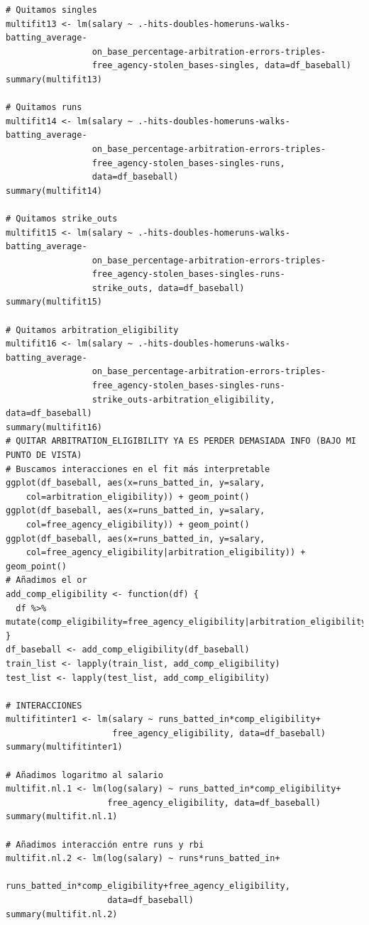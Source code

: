 \documentclass[a4paper,12pt, oneside]{book}
\begin{document}
\begin{verbatim}
# Quitamos singles
multifit13 <- lm(salary ~ .-hits-doubles-homeruns-walks-batting_average-
	             on_base_percentage-arbitration-errors-triples-
	             free_agency-stolen_bases-singles, data=df_baseball)
summary(multifit13)

# Quitamos runs
multifit14 <- lm(salary ~ .-hits-doubles-homeruns-walks-batting_average-
	             on_base_percentage-arbitration-errors-triples-
	             free_agency-stolen_bases-singles-runs,
	             data=df_baseball)
summary(multifit14)

# Quitamos strike_outs
multifit15 <- lm(salary ~ .-hits-doubles-homeruns-walks-batting_average-
	             on_base_percentage-arbitration-errors-triples-
	             free_agency-stolen_bases-singles-runs-
	             strike_outs, data=df_baseball)
summary(multifit15)

# Quitamos arbitration_eligibility
multifit16 <- lm(salary ~ .-hits-doubles-homeruns-walks-batting_average-
	             on_base_percentage-arbitration-errors-triples-
	             free_agency-stolen_bases-singles-runs-
	             strike_outs-arbitration_eligibility, data=df_baseball)
summary(multifit16)
# QUITAR ARBITRATION_ELIGIBILITY YA ES PERDER DEMASIADA INFO (BAJO MI PUNTO DE VISTA)
# Buscamos interacciones en el fit más interpretable
ggplot(df_baseball, aes(x=runs_batted_in, y=salary, 
	col=arbitration_eligibility)) + geom_point()
ggplot(df_baseball, aes(x=runs_batted_in, y=salary, 
	col=free_agency_eligibility)) + geom_point()
ggplot(df_baseball, aes(x=runs_batted_in, y=salary, 
	col=free_agency_eligibility|arbitration_eligibility)) + geom_point()
# Añadimos el or
add_comp_eligibility <- function(df) {
  df %>% mutate(comp_eligibility=free_agency_eligibility|arbitration_eligibility)
}
df_baseball <- add_comp_eligibility(df_baseball)
train_list <- lapply(train_list, add_comp_eligibility)
test_list <- lapply(test_list, add_comp_eligibility)

# INTERACCIONES
multifitinter1 <- lm(salary ~ runs_batted_in*comp_eligibility+
	                 free_agency_eligibility, data=df_baseball)
summary(multifitinter1)

# Añadimos logaritmo al salario
multifit.nl.1 <- lm(log(salary) ~ runs_batted_in*comp_eligibility+
	                free_agency_eligibility, data=df_baseball)
summary(multifit.nl.1)

# Añadimos interacción entre runs y rbi
multifit.nl.2 <- lm(log(salary) ~ runs*runs_batted_in+
	                runs_batted_in*comp_eligibility+free_agency_eligibility,
	                data=df_baseball)
summary(multifit.nl.2)


\end{verbatim}
\end{document}
